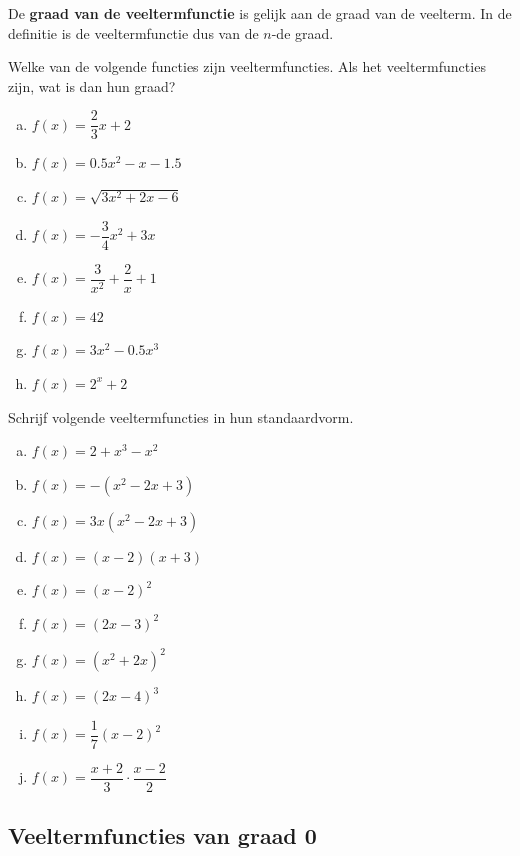 \documentclass[12pt,twoside,a4paper]{article}
\begin{document}
De {\bf graad van de veeltermfunctie} is gelijk aan de graad van de veelterm. In de definitie is de veeltermfunctie dus van de $n$-de graad.

\begin{oefening}
  Welke van de volgende functies zijn veeltermfuncties. Als het veeltermfuncties zijn, wat is dan hun graad?
\begin{multicols}{2}
  \begin{enumerate}[(a)]
  \itemsep.8em
  \item $f(x)=\dfrac{2}{3}x+2$
  \item $f(x)=0.5x^2-x-1.5$
  \item $f(x)=\sqrt{3x^2+2x-6}$
  \item $f(x)=-\dfrac{3}{4}x^2+3x$
  \item $f(x)=\dfrac{3}{x^2}+\dfrac{2}{x}+1$
  \item $f(x)=42$
  \item $f(x)=3x^2-0.5x^3$
  \item $f(x)=2^x+2$
  \end{enumerate}
\end{multicols}
\end{oefening}

\begin{oefening}
Schrijf volgende veeltermfuncties in hun standaardvorm.
\begin{multicols}{2}
  \begin{enumerate}[(a)]
  \itemsep.8em
  \item $f(x)=2+x^3-x^2$
  \item $f(x)=-(x^2-2x+3)$
  \item $f(x)=3x(x^2-2x+3)$
  \item $f(x)=(x-2)(x+3)$
  \item $f(x)=(x-2)^2$
  \item $f(x)=(2x-3)^2$
  \item $f(x)=(x^2+2x)^2$
  \item $f(x)=(2x-4)^3$
  \item $f(x)=\dfrac{1}{7}(x-2)^2$
  \item $f(x)=\dfrac{x+2}{3}\cdot\dfrac{x-2}{2}$
  \end{enumerate}
\end{multicols}
\end{oefening}

\subsection{Veeltermfuncties van graad 0}
\end{document}
